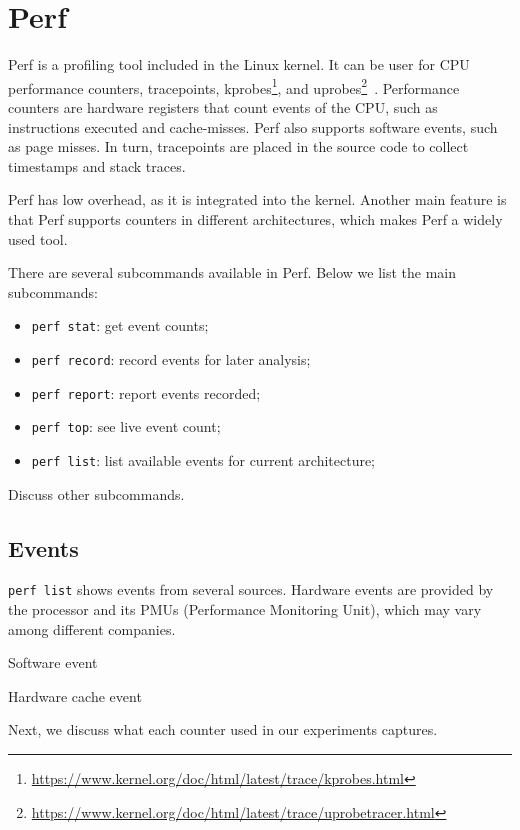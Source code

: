 \section{Perf}

Perf is a profiling tool included in the Linux kernel. It can be user for CPU performance counters, tracepoints, kprobes\footnote{\url{https://www.kernel.org/doc/html/latest/trace/kprobes.html}}, and uprobes\footnote{\url{https://www.kernel.org/doc/html/latest/trace/uprobetracer.html}}~\cite{perf_wiki}. Performance counters are hardware registers that count events of the CPU, such as instructions executed and cache-misses. Perf also supports software events, such as page misses. In turn, tracepoints are placed in the source code to collect timestamps and stack traces.

Perf has low overhead, as it is integrated into the kernel. Another main feature is that Perf supports counters in different architectures, which makes Perf a widely used tool.

There are several subcommands available in Perf. Below we list the main subcommands:

\begin{itemize}
	\item \texttt{perf stat}: get event counts;
	\item \texttt{perf record}: record events for later analysis;
	\item \texttt{perf report}: report events recorded;
	\item \texttt{perf top}: see live event count;
	\item \texttt{perf list}: list available events for current architecture;
\end{itemize}

Discuss other subcommands.

\subsection{Events}

\texttt{perf list} shows events from several sources. Hardware events are provided by the processor and its PMUs (Performance Monitoring Unit), which may vary among different companies.

Software event

Hardware cache event

Next, we discuss what each counter used in our experiments captures.

